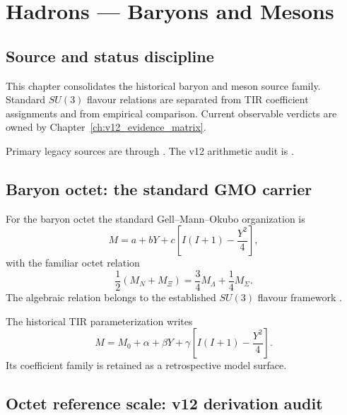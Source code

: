 \clearpage

\chapter{Hadrons — Baryons and Mesons}
\label{ch:v12_hadrons}

\section{Source and status discipline}

This chapter consolidates the historical baryon and meson source family. Standard $SU(3)$ flavour relations are separated from TIR coefficient assignments and from empirical comparison. Current observable verdicts are owned by Chapter~\ref{ch:v12_evidence_matrix}.

Primary legacy sources are
 through . The v12 arithmetic audit is
.

\section{Baryon octet: the standard GMO carrier}

For the baryon octet the standard Gell--Mann--Okubo organization is
\begin{equation}
M = a+bY+c\left[I(I+1)-\frac{Y^2}{4}\right],
\label{eq:v12_gmo_standard}
\end{equation}
with the familiar octet relation
\begin{equation}
\boxed{
\frac12(M_N+M_\Xi)=\frac34M_\Lambda+\frac14M_\Sigma.
}
\label{eq:v12_gmo_relation}
\end{equation}
The algebraic relation belongs to the established $SU(3)$ flavour framework \cite{GellMann1962,okubo1962}.

The historical TIR parameterization writes
\begin{equation}
M=M_0+\alpha+\beta Y+\gamma\left[I(I+1)-\frac{Y^2}{4}\right].
\label{eq:v12_tir_gmo}
\end{equation}
Its coefficient family is retained as a retrospective model surface.

\section{Octet reference scale: v12 derivation audit}

